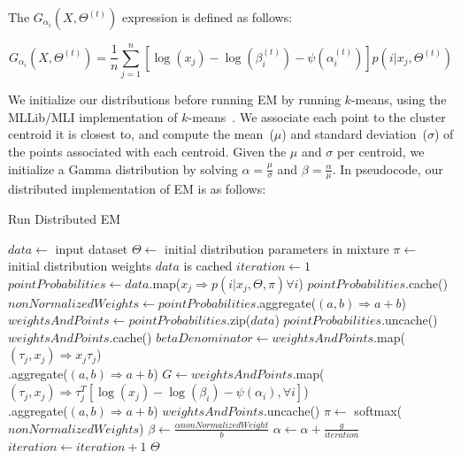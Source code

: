 \documentclass{llncs}
\begin{document}
The $G_{\alpha_i}(X, \Theta^{(t)})$ expression is defined as follows:

\begin{equation}
\label{eq:gamma-em-g}
G_{\alpha_i}(X, \Theta^{(t)}) = \frac{1}{n} \sum_{j = 1}^n [\log(x_j) - \log(\beta_i^{(t)}) -
\psi(\alpha_i^{(t)})] p(i | x_j, \Theta^{(t)})
\end{equation}

We initialize our distributions before running EM by running $k$-means, using the MLLib/MLI
implementation of $k$-means~\cite{sparks13}. We associate each point to the cluster centroid it is
closest to, and compute the mean~($\mu$) and standard deviation~($\sigma$) of the points associated with each
centroid. Given the $\mu$ and $\sigma$ per centroid, we initialize a Gamma distribution by solving
$\alpha = \frac{\mu}{\sigma}$ and $\beta = \frac{\alpha}{\mu}$. In pseudocode, our distributed
implementation of EM is as follows:

\begin{algorithm}
\caption{Run Distributed EM}
\label{alg:distributed-em}
\begin{algorithmic}
\STATE $data \leftarrow$ input dataset
\STATE $\Theta \leftarrow$ initial distribution parameters in mixture
\STATE $\pi \leftarrow$ initial distribution weights
\REQUIRE $data$ is cached
\STATE $iteration \leftarrow 1$
\REPEAT
\STATE $pointProbabilities \leftarrow data$.map($x_j \Rightarrow p(i | x_j, \Theta, \pi) \forall i$)
\STATE $pointProbabilities$.cache()
\STATE $nonNormalizedWeights \leftarrow pointProbabilities$.aggregate($(a, b) \Rightarrow a + b$)
\STATE $weightsAndPoints \leftarrow pointProbabilities$.zip($data$)
\STATE $pointProbabilities$.uncache()
\STATE $weightsAndPoints$.cache()
\STATE $betaDenominator \leftarrow weightsAndPoints$.map($(\tau_j, x_j) \Rightarrow x_j \tau_j$)\\
\hspace{\algorithmicindent}.aggregate($(a, b) \Rightarrow a + b$)
\STATE $G \leftarrow weightsAndPoints$.map($(\tau_j, x_j) \Rightarrow \tau_j^T [\log(x_j) - \log(\beta_i) - \psi(\alpha_i), \forall i]$)\\
\hspace{\algorithmicindent}.aggregate($(a, b) \Rightarrow a + b$)
\STATE $weightsAndPoints$.uncache()
\STATE $\pi \leftarrow$ softmax($nonNormalizedWeights$)
\STATE $\beta \leftarrow \frac{\alpha nonNormalizedWeight}{b}$
\STATE $\alpha \leftarrow \alpha + \frac{g}{iteration}$
\ENDFOR
\STATE $iteration \leftarrow iteration + 1$
\RETURN $\Theta$
\end{algorithmic}
\end{algorithm}
\end{document}
